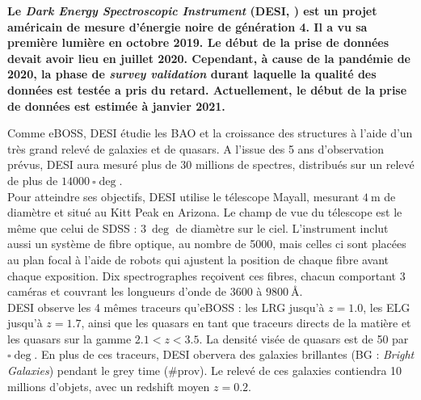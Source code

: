 \documentclass[11pt, twoside, a4paper, openright]{report}
\begin{document}
\textbf{
Le \emph{Dark Energy Spectroscopic Instrument} (DESI, \textcite{DESICollaboration2016}) est un projet américain de mesure d'énergie noire de génération 4.
Il a vu sa première lumière en octobre 2019. %
Le début de la prise de données devait avoir lieu en juillet 2020. Cependant, à cause de la pandémie de 2020, la phase de \emph{survey validation} durant laquelle la qualité des données est testée a pris du retard. Actuellement, le début de la prise de données est estimée à janvier 2021.
}

Comme eBOSS, DESI étudie les BAO et la croissance des structures à l'aide d'un très grand relevé de galaxies et de quasars. A l'issue des 5 ans d'observation prévus, DESI aura mesuré plus de 30 millions de spectres, distribués sur un relevé de plus de $\SI{14000}{\square\deg}$. \\
Pour atteindre ses objectifs, DESI utilise le télescope Mayall, mesurant $\SI{4}{\meter}$ de diamètre et situé au Kitt Peak en Arizona. Le champ de vue du télescope est le même que celui de SDSS : $\SI{3}{\deg}$ de diamètre sur le ciel. L'instrument inclut aussi un système de fibre optique, au nombre de \num{5000}, mais celles ci sont placées au plan focal à l'aide de robots qui ajustent la position de chaque fibre avant chaque exposition. Dix spectrographes reçoivent ces fibres, chacun comportant 3 caméras et couvrant les longueurs d'onde de \num{3600} à $\SI{9800}{\angstrom}$. \\
‌‌DESI observe les 4 mêmes traceurs qu'eBOSS : les LRG jusqu'à $z=\num{1,0}$, les ELG jusqu'à $z=\num{1,7}$, ainsi que les quasars en tant que traceurs directs de la matière et les quasars \lya{} sur la gamme $\num{2,1} < z < \num{3,5}$. La densité visée de quasars \lya{} est de \num{50} par $\si{\square\deg}$.
En plus de ces traceurs, DESI obervera des galaxies brillantes (BG : \emph{Bright Galaxies}) pendant le grey time (\#prov). Le relevé de ces galaxies contiendra 10 millions d'objets, avec un redshift moyen $z=\num{0,2}$.
\end{document}
